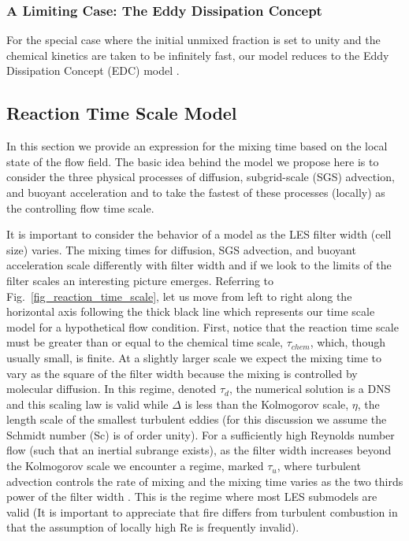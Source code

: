 \subsubsection{A Limiting Case: The Eddy Dissipation Concept}

For the special case where the initial unmixed fraction is set to unity and the chemical kinetics are taken to be infinitely fast, our model reduces to the Eddy Dissipation Concept (EDC) model \cite{Magnussen:1,Poinsot:TNC}.



\subsection{Reaction Time Scale Model}
\label{sec:reac_time_scale}

In this section we provide an expression for the mixing time based on the local state of the flow field.  The basic idea behind the model we propose here is to consider the three physical processes of diffusion, subgrid-scale (SGS) advection, and buoyant acceleration and to take the fastest of these processes (locally) as the controlling flow time scale.

It is important to consider the behavior of a model as the LES filter width (cell size) varies. The mixing times for diffusion, SGS advection, and buoyant acceleration scale differently with filter width and if we look to the limits of the filter scales an interesting picture emerges.  Referring to Fig.~\ref{fig_reaction_time_scale}, let us move from left to right along the horizontal axis following the thick black line which represents our time scale model for a hypothetical flow condition.  First, notice that the reaction time scale must be greater than or equal to the chemical time scale, $\tau_{chem}$, which, though usually small, is finite. At a slightly larger scale we expect the mixing time to vary as the square of the filter width because the mixing is controlled by molecular diffusion.  In this regime, denoted $\tau_d$, the numerical solution is a DNS and this scaling law is valid while $\Delta$ is less than the Kolmogorov scale, $\eta$, the length scale of the smallest turbulent eddies (for this discussion we assume the Schmidt number (Sc) is of order unity). For a sufficiently high Reynolds number flow (such that an inertial subrange exists), as the filter width increases beyond the Kolmogorov scale we encounter a regime, marked $\tau_u$, where turbulent advection controls the rate of mixing and the mixing time varies as the two thirds power of the filter width \cite{Pope:2000}.  This is the regime where most LES submodels are valid (It is important to appreciate that fire differs from turbulent combustion in that the assumption of locally high Re is frequently invalid).

